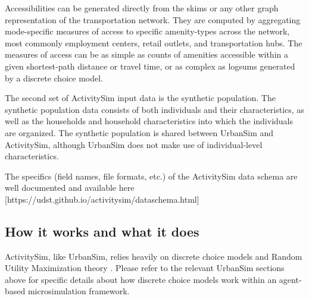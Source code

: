 Accessibilities can be generated directly from the skims or any other graph representation of the transportation network. They are computed by aggregating mode-specific measures of access to specific amenity-types across the network, most commonly employment centers, retail outlets, and transportation hubs. The measures of access can be as simple as counts of amenities accessible within a given shortest-path distance or travel time, or as complex as logsums generated by a discrete choice model. 

The second set of ActivitySim input data is the synthetic population. The synthetic population data consists of both individuals and their characteristics, as well as the households and household characteristics into which the individuals are organized. The synthetic population is shared between UrbanSim and ActivitySim, although UrbanSim does not make use of individual-level characteristics. 

The specifics (field names, file formats, etc.) of the ActivitySim data schema are well documented and available here [https://udst.github.io/activitysim/dataschema.html]

\subsection{How it works and what it does}

ActivitySim, like UrbanSim, relies heavily on discrete choice models and Random Utility Maximization theory \citep{mcfadden-1974}. Please refer to the relevant UrbanSim sections above for specific details about how discrete choice models work within an agent-based microsimulation framework.

